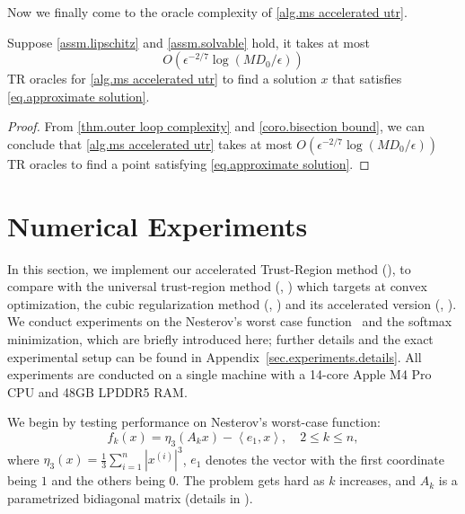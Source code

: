 \documentclass{article}
\begin{document}
Now we finally come to the oracle complexity of \autoref{alg.ms accelerated utr}.
\begin{theorem}
    \label{thm.final complexity of msatr}
    Suppose \autoref{assm.lipschitz} and \autoref{assm.solvable} hold, it takes at most 
    \begin{equation}
        \label{eq.final complexity of msatr}
        O\left(\epsilon^{-2/7}\log\left(MD_0/\epsilon\right)\right)
    \end{equation}
    TR oracles for \autoref{alg.ms accelerated utr} to find a solution $x$ that satisfies \eqref{eq.approximate solution}.
\end{theorem}
\begin{proof}    
    From \autoref{thm.outer loop complexity} and \autoref{coro.bisection bound}, we can conclude that \autoref{alg.ms accelerated utr} takes at most $O\left(\epsilon^{-2/7}\log \left(MD_0/\epsilon\right)\right)$ TR oracles to find a point satisfying \eqref{eq.approximate solution}.
\end{proof}

\section{Numerical Experiments}\label{sec.experiments}
In this section, we implement our accelerated Trust-Region method (\atr{}), to compare with the universal trust-region method (\utr{}, \citet{jiang2024nonconvexityuniversaltrustregionmethod}) which targets at convex optimization, the cubic regularization method (\arc{}, \citet{nesterov2006cubic}) and its accelerated version (\arca{}, \citet{nesterov2008accelerating}). We conduct experiments on the Nesterov's worst case function~\cite{nesterovImplementableTensorMethods2021} and the softmax minimization, which are briefly introduced here; further details and the exact experimental setup can be found in Appendix~\ref{sec.experiments.details}. All experiments are conducted on a single machine with a 14-core Apple M4 Pro CPU  and 48GB LPDDR5 RAM.

We begin by testing performance on Nesterov's worst-case function:
\[
    f_k(x) = \eta_{3}\left(A_k x\right) - \left\langle e_1, x\right\rangle, \quad 2 \leq k \leq n,
\]
where $\eta_{3}(x) = \frac{1}{3}\sum_{i=1}^n |x^{(i)}|^{3}$, $e_1$ denotes the vector with the first coordinate being $1$ and the others being $0$. The problem gets hard as $k$ increases, and $A_k$ is a parametrized bidiagonal matrix (details in ).
\end{document}
